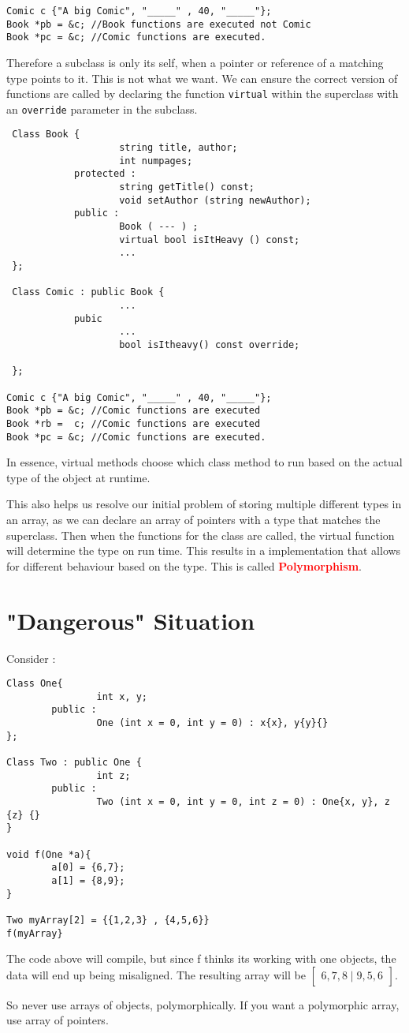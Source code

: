 \documentclass{article}
\begin{document}
 \begin{lstlisting}
Comic c {"A big Comic", "_____" , 40, "_____"};
Book *pb = &c; //Book functions are executed not Comic
Book *pc = &c; //Comic functions are executed. 
 \end{lstlisting} 
 
 Therefore a subclass is only its self, when a pointer or reference of a matching type points to it. This is not what we want. We can ensure the correct version of functions are called by declaring the function \verb|virtual| within the superclass with an \verb|override| parameter in the subclass.
 \begin{lstlisting}
 Class Book {
 					string title, author; 
 					int numpages; 
 			protected :
 					string getTitle() const;
 					void setAuthor (string newAuthor);
 			public : 
					Book ( --- ) ; 
					virtual bool isItHeavy () const; 					
 					...
 }; 
 
 Class Comic : public Book {
 					...
 			pubic 
 					...
 					bool isItheavy() const override; 
 	
 };
 
Comic c {"A big Comic", "_____" , 40, "_____"};
Book *pb = &c; //Comic functions are executed 
Book *rb =  c; //Comic functions are executed 
Book *pc = &c; //Comic functions are executed. 
 \end{lstlisting}
 
In essence, virtual methods choose which class method to run based on the actual type of the object at runtime. 

This also helps us resolve our initial problem of storing multiple different types in an array, as we can declare an array of pointers with a type that matches the superclass. Then when the functions for the class are called, the virtual function will determine the type on run time. This results in a implementation that allows for different behaviour based on the type. This is called \textbf{\textcolor{red}{Polymorphism}}.
 \newpage
\section{"Dangerous" Situation}
Consider : 
\begin{lstlisting}
Class One{
				int x, y; 
		public : 
				One (int x = 0, int y = 0) : x{x}, y{y}{}
};

Class Two : public One {
				int z; 
		public : 
				Two (int x = 0, int y = 0, int z = 0) : One{x, y}, z {z} {}
}

void f(One *a){
		a[0] = {6,7};
		a[1] = {8,9};
}

Two myArray[2] = {{1,2,3} , {4,5,6}}
f(myArray}
\end{lstlisting}

The code above will compile, but since f thinks its working with one objects, the data will end up being misaligned. The resulting array will be \(\begin{bmatrix}  6, 7, 8 \mid 9, 5, 6\end{bmatrix}\).

So never use arrays of objects, polymorphically. If you want a polymorphic array, use array of pointers. 
\end{document}
